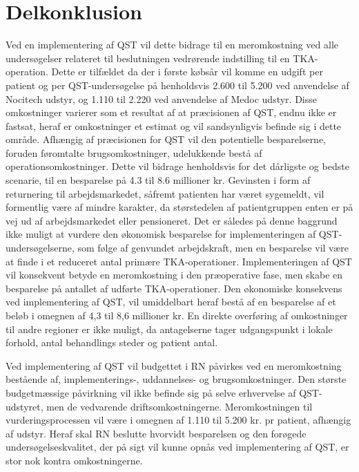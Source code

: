 \section{Delkonklusion}
Ved en implementering af QST vil dette bidrage til en meromkostning ved alle undersøgelser relateret til beslutningen vedrørende indstilling til en TKA-operation. Dette er tilfældet da der i første købsår vil komme en udgift per patient og per QST-undersøgelse på henholdsvis 2.600 til 5.200 ved anvendelse af Nocitech udstyr, og 1.110 til 2.220 ved anvendelse af Medoc udstyr. Disse omkostninger varierer som et resultat af at præcisionen af QST, endnu ikke er fastsat, heraf er omkostninger et estimat og vil sandsynligvis befinde sig i dette område. Afhængig af præcisionen for QST vil den potentielle besparelserne, foruden føromtalte brugsomkostninger, udelukkende bestå af operationsomkostninger. Dette vil bidrage henholdsvis for det dårligste og bedste scenarie, til en besparelse på 4.3 til 8.6 millioner kr. Gevinsten i form af returnering til arbejdsmarkedet, såfremt patienten har været sygemeldt, vil formentlig være af mindre karakter, da størstedelen af patientgruppen enten er på vej ud af arbejdsmarkedet eller pensioneret. Det er således på denne baggrund ikke muligt at vurdere den økonomisk besparelse for implementeringen af QST-undersøgelserne, som følge af genvundet arbejdskraft, men en besparelse vil være at finde i et reduceret antal primære TKA-operationer. Implementeringen af QST vil konsekvent betyde en meromkostning i den præoperative fase, men skabe en besparelse på antallet af udførte TKA-operationer. Den økonomiske konsekvens ved implementering af QST, vil umiddelbart heraf bestå af en besparelse af et beløb i omegnen af 4,3 til 8,6 millioner kr. En direkte overføring af omkostninger til andre regioner er ikke muligt, da antagelserne tager udgangspunkt i lokale forhold, antal behandlings steder og patient antal.

Ved implementering af QST vil budgettet i RN påvirkes ved en meromkostning bestående af, implementerings-, uddannelses- og brugsomkostninger. Den største budgetmæssige påvirkning vil ikke befinde sig på selve erhvervelse af QST-udstyret, men de vedvarende driftsomkostningerne. Meromkostningen til vurderingsprocessen vil være i omegnen af 1.110 til 5.200 kr. pr patient, afhængig af udstyr. Heraf skal RN beslutte hvorvidt besparelsen og den forøgede undersøgelseskvalitet, der på sigt vil kunne opnås ved implementering af QST, er stor nok kontra omkostningerne. 